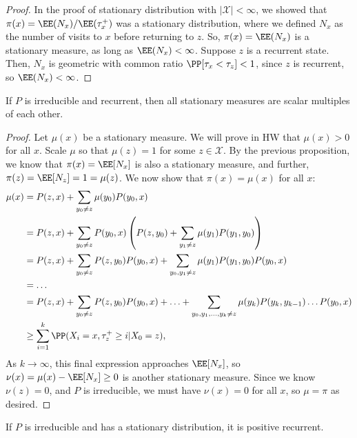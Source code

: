 \begin{proof}
In the proof of stationary distribution with $\vert \mathcal{X}\vert < \infty$, we showed that $\pi(x) = \EE(N_x)/\EE(\tau_x^+)$ was a stationary distribution, where we defined $N_x$ as the number of visits to $x$ before returning to $z$. So, $\pi(x) = \EE(N_x)$ is a stationary measure, as long as $\EE(N_x) < \infty$. Suppose $z$ is a recurrent state. Then, $N_x$ is geometric with common ratio $\PP[\tau_x < \tau_z] < 1$, since $z$ is recurrent, so $\EE(N_x) < \infty$.
\end{proof}

\begin{theorem}
\proplabel

If $P$ is irreducible and recurrent, then all stationary measures are scalar multiples of each other. 
\end{theorem}

\begin{proof}
Let $\mu(x)$ be a stationary measure. We will prove in HW that $\mu(x) > 0$ for all $x$. Scale $\mu$ so that $\mu(z) = 1$ for some $z\in \mathcal{X}$. By the previous proposition, we know that $\pi(x) = \EE[N_x]$ is also a stationary measure, and further, $\pi(z) = \EE[N_z] = 1 = \mu(z)$. We now show that $\pi(x) = \mu(x)$ for all $x$:
\begin{align*}
    \mu(x) &= P(z,x) + \sum_{y_0\neq z}\mu(y_0)P(y_0,x) \\
    &= P(z,x) + \sum_{y_0\neq z}P(y_0,x)\left(P(z,y_0) + \sum_{y_1\neq z}\mu(y_1)P(y_1,y_0)\right) \\
    &= P(z,x) + \sum_{y_0\neq z}P(z,y_0)P(y_0,x) + \sum_{y_0,y_1\neq z}\mu(y_1)P(y_1,y_0)P(y_0,x) \\
    &= \hdots \\
    &= P(z,x) + \sum_{y_0\neq z}P(z,y_0)P(y_0,x) + \hdots + \sum_{y_0, y_1, \hdots, y_k\neq z}\mu(y_k)P(y_k,y_{k-1})\hdots P(y_0,x) \\
    &\geq \sum_{i=1}^k \PP(X_i=x, \tau_z^+\geq i | X_0=z),
\end{align*}
As $k\rightarrow \infty$, this final expression approaches $\EE[N_x]$, so $\nu(x) = \mu(x)-\EE[N_x] \geq 0$ is another stationary measure. Since we know $\nu(z) = 0$, and $P$ is irreducible, we must have $\nu(x) = 0$ for all $x$, so $\mu = \pi$ as desired.
\end{proof}

\begin{theorem}
\proplabel

If $P$ is irreducible and has a stationary distribution, it is positive recurrent. 
\end{theorem}

